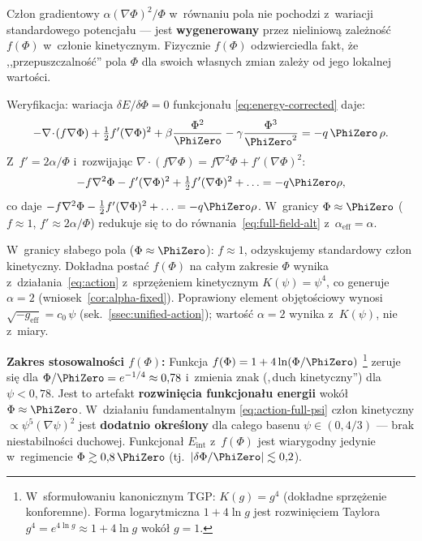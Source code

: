 \begin{remark}\label{rem:kinetic-origin}
Cz\l{}on gradientowy $\alpha(\nabla\Phi)^2/\Phi$
w~r\'ownaniu pola nie pochodzi z~wariacji standardowego
potencja\l{}u --- jest \textbf{wygenerowany} przez
nieliniow\k{a} zale\.zno\'s\'c $f(\Phi)$ w~cz\l{}onie
kinetycznym. Fizycznie $f(\Phi)$ odzwierciedla fakt,
\.ze ,,przepuszczalno\'s\'c'' pola $\Phi$ dla swoich
w\l{}asnych zmian zale\.zy od jego lokalnej warto\'sci.

Weryfikacja: wariacja $\delta E/\delta\Phi = 0$ funkcjona\l{}u
\eqref{eq:energy-corrected} daje:
\begin{equation}\label{eq:energy-functional}
  -\nabla\!\cdot\!(f\nabla\Phi) + \tfrac{1}{2}f'(\nabla\Phi)^2
  + \beta\frac{\Phi^2}{\PhiZero}
  - \gamma\frac{\Phi^3}{\PhiZero^2}
  = -q\,\PhiZero\,\rho.
\end{equation}
Z~$f' = 2\alpha/\Phi$ i~rozwijaj\k{a}c
$\nabla\!\cdot\!(f\nabla\Phi) = f\nabla^2\Phi + f'(\nabla\Phi)^2$:
\begin{equation}
  -f\nabla^2\Phi - f'(\nabla\Phi)^2 + \tfrac{1}{2}f'(\nabla\Phi)^2
  + \ldots = -q\PhiZero\rho,
\end{equation}
co daje $-f\nabla^2\Phi - \frac{1}{2}f'(\nabla\Phi)^2 + \ldots
= -q\PhiZero\rho$. W~granicy $\Phi \approx \PhiZero$
($f \approx 1$, $f' \approx 2\alpha/\Phi$) redukuje si\k{e} to do
r\'ownania~\eqref{eq:full-field-alt} z~$\alpha_{\mathrm{eff}} = \alpha$.

W~granicy s\l{}abego pola ($\Phi \approx \PhiZero$):
$f \approx 1$, odzyskujemy standardowy cz\l{}on kinetyczny.
Dok\l{}adna posta\'c $f(\Phi)$ na ca\l{}ym zakresie
$\Phi$ wynika z~dzia\l{}ania~\eqref{eq:action}
z~sprz\k{e}\.zeniem kinetycznym $K(\psi) = \psi^4$,
co generuje $\alpha = 2$ (wniosek~\ref{cor:alpha-fixed}).
Poprawiony element obj\k{e}to\'sciowy wynosi
$\sqrt{-g_{\mathrm{eff}}} = c_0\,\psi$
(sek.~\ref{ssec:unified-action}); warto\'s\'c $\alpha=2$
wynika z~$K(\psi)$, nie z~miary.

\medskip\noindent\textbf{Zakres stosowalno\'sci $f(\Phi)$:}
Funkcja $f(\Phi) = 1 + 4\ln(\Phi/\PhiZero)$%
\footnote{W~sformu\l{}owaniu kanonicznym TGP: $K(g) = g^4$ (dok\l{}adne sprz\k{e}\.zenie konforemne). Forma logarytmiczna $1 + 4\ln g$ jest rozwini\k{e}ciem Taylora $g^4 = e^{4\ln g} \approx 1 + 4\ln g$ wok\'o\l{} $g = 1$.}
zeruje si\k{e}
dla $\Phi/\PhiZero = e^{-1/4} \approx 0{,}78$ i~zmienia znak
(,\,duch kinetyczny'') dla $\psi < 0{,}78$.
Jest to artefakt \textbf{rozwini\k{e}cia funkcjona\l{}u energii}
wok\'o\l{} $\Phi \approx \PhiZero$. W~dzia\l{}aniu fundamentalnym
\eqref{eq:action-full-psi} cz\l{}on kinetyczny $\propto \psi^5(\nabla\psi)^2$
jest \textbf{dodatnio okre\'slony} dla ca\l{}ego basenu
$\psi \in (0, 4/3)$ --- brak niestabilno\'sci duchowej.
Funkcjona\l{} $E_{\mathrm{int}}$ z~$f(\Phi)$ jest wiarygodny
jedynie w~regimencie $\Phi \gtrsim 0{,}8\,\PhiZero$
(tj.\ $|\delta\Phi/\PhiZero| \lesssim 0{,}2$).
\end{remark}

